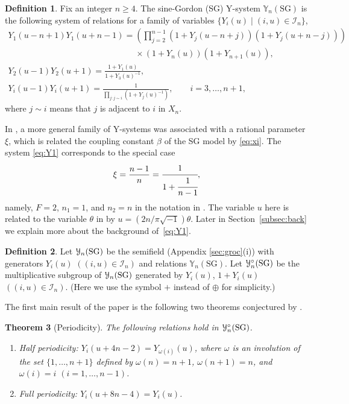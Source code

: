 \documentclass[11pt]{article}
\numberwithin{equation}{section}
\newtheorem{Theorem}{Theorem}[section]
\theoremstyle{definition}
\newtheorem{Definition}[Theorem]{Definition}
\begin{document}
\begin{Definition}
\label{def:SGY}
Fix an integer $n \geq 4$.
The sine-Gordon (SG)
Y-system $\mathbb{Y}_{n}(\mathrm{SG})$
is the following system of relations for
a family of variables
 $\{Y_i(u) \mid (i,u)\in \mathcal{I}_n \}$,
\begin{gather}
Y_1\left(u-n+1\right)
Y_1\left(u+n-1\right)
=
\left(\prod_{j=2}^{n-1}(1+Y_j(u-n+j))(1+Y_j(u+n-j))\right)\nonumber\\
\phantom{Y_1\left(u-n+1\right)
Y_1\left(u+n-1\right)
=}{}
 \times (1+Y_n(u))(1+Y_{n+1}(u)),
\nonumber\\
Y_2(u-1) Y_2(u+1)
=
\frac
{1+Y_1(u)}
{1+Y_3(u)^{-1}}
,\nonumber\\
Y_i(u-1)Y_i(u+1)
=
\frac{1}{\prod\limits_{j:j\sim i} (1+Y_j(u)^{-1})},
\qquad i=3,\dots,n+1,\label{eq:Y1}
\end{gather}
where $j\sim i$ means that $j$ is adjacent to $i$ in $X_n$.
\end{Definition}

In \cite{Tateo95}, a more general
family of Y-systems was associated with
a rational parameter $\xi$,
which is related  the coupling constant $\beta$
 of the SG model by \eqref{eq:xi}.
The system \eqref{eq:Y1} corresponds to
the special case
\begin{gather}
\label{eq:case1}
\xi=\frac{n-1}{n}=
\cfrac{1}{ 1 +
\cfrac{1}{n-1}
},
\end{gather}
namely, $F=2$, $n_1=1$, and $n_2=n$ in the notation
in \cite{Tateo95}.
The variable $u$ here is related to the variable $\theta$
in \cite{Tateo95} by $u = (2n/\pi\sqrt{-1})\theta$.
Later in Section~\ref{subsec:back} we explain more about the background
of~\eqref{eq:Y1}.

\begin{Definition}
\label{def:YC}
Let $\EuScript{Y}_{n}(\mathrm{SG})$
be the semif\/ield (Appendix \ref{sec:groc}(i)) with generators
$Y_i(u)$
 $((i,u)\in \mathcal{I}_{n})$
and relations $\mathbb{Y}_{n}(\mathrm{SG})$.
Let $\EuScript{Y}^{\circ}_{n}(\mathrm{SG})$
be the multiplicative subgroup
of $\EuScript{Y}_{n}(\mathrm{SG})$
generated by
$Y_i(u)$, $1+Y_i(u)$
 $((i,u)\in \mathcal{I}_{n})$.
(Here we use the symbol $+$ instead of $\oplus$
for simplicity.)
\end{Definition}
The f\/irst main result of the paper is
the following two theorems conjectured by
\cite{Tateo95}.

\begin{Theorem}[Periodicity]
\label{thm:Yperiod}
The following relations hold in $\EuScript{Y}^{\circ}_{n}(\mathrm{SG})$.
\begin{enumerate}\itemsep=0pt
\item[$(i)$] Half periodicity: $Y_i(u+4n-2)=Y_{\omega(i)}(u)$, where
$\omega$ is an involution of the set $\{1,\dots,n+1\}$
defined by $\omega(n)=n+1$, $\omega(n+1)=n$,
and $\omega(i)=i$ $(i=1,\dots,n-1)$.
\item[$(ii)$] Full periodicity: $Y_i(u+8n-4)=Y_i(u)$.
\end{enumerate}
\end{Theorem}
\end{document}
